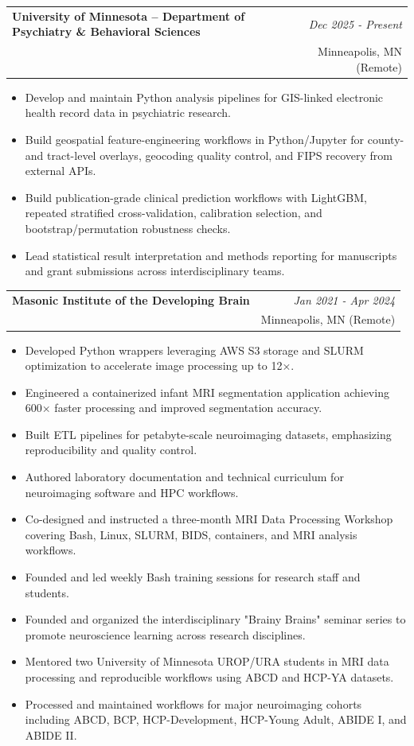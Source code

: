 \documentclass[a4paper,11pt]{article}
\makeatletter
\newcommand{\resumeExp}[4]{
\vspace{2mm}\item[]
    \begin{tabular*}{\textwidth}[t]{l@{\extracolsep{\fill}}r}
        \hspace{-4.4mm} \textbf{#1} \vspace{0mm} & {\footnotesize\emph{#3}}\vspace{0mm}\\
        \hspace{-4.3mm} \footnotesize{\text{#2}} \vspace{2mm} &\footnotesize{#4}
    \end{tabular*}
    \vspace{-6.1mm}
}
\newcommand{\resumeItemListStart}{\begin{justify}\begin{itemize}[leftmargin=3ex, rightmargin=2ex, noitemsep,labelsep=1.2mm,itemsep=0mm]\small}
\newcommand{\resumeItemListEnd}{\end{itemize}\end{justify}\vspace{-1.5mm}}
\makeatother
\begin{document}
\resumeExp
{University of Minnesota – Department of Psychiatry \& Behavioral Sciences}
{Research Software Engineer III}
{Dec 2025 - Present}
{Minneapolis, MN (Remote)}
\resumeItemListStart
\item[$\bullet$] Develop and maintain Python analysis pipelines for GIS-linked electronic health record data in psychiatric research.
\item[$\bullet$] Build geospatial feature-engineering workflows in Python/Jupyter for county- and tract-level overlays, geocoding quality control, and FIPS recovery from external APIs.
\item[$\bullet$] Build publication-grade clinical prediction workflows with LightGBM, repeated stratified cross-validation, calibration selection, and bootstrap/permutation robustness checks.
\item[$\bullet$] Lead statistical result interpretation and methods reporting for manuscripts and grant submissions across interdisciplinary teams.
\resumeItemListEnd

\resumeExp
{Masonic Institute of the Developing Brain}
{Research Software Engineer II (promoted to III)}
{Jan 2021 - Apr 2024}
{Minneapolis, MN (Remote)}
\resumeItemListStart
\item[$\bullet$] Developed Python wrappers leveraging AWS S3 storage and SLURM optimization to accelerate image processing up to 12×.
\item[$\bullet$] Engineered a containerized infant MRI segmentation application achieving 600× faster processing and improved segmentation accuracy.
\item[$\bullet$] Built ETL pipelines for petabyte-scale neuroimaging datasets, emphasizing reproducibility and quality control.
\item[$\bullet$] Authored laboratory documentation and technical curriculum for neuroimaging software and HPC workflows.
\item[$\bullet$] Co-designed and instructed a three-month MRI Data Processing Workshop covering Bash, Linux, SLURM, BIDS, containers, and MRI analysis workflows.
\item[$\bullet$] Founded and led weekly Bash training sessions for research staff and students.
\item[$\bullet$] Founded and organized the interdisciplinary "Brainy Brains" seminar series to promote neuroscience learning across research disciplines.
\item[$\bullet$] Mentored two University of Minnesota UROP/URA students in MRI data processing and reproducible workflows using ABCD and HCP-YA datasets.
\item[$\bullet$] Processed and maintained workflows for major neuroimaging cohorts including ABCD, BCP, HCP-Development, HCP-Young Adult, ABIDE I, and ABIDE II.
\resumeItemListEnd
\end{document}
